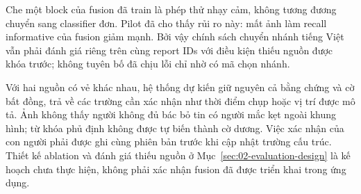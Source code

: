 Che một block của fusion đã train là phép thử nhạy cảm, không tương đương chuyển sang classifier đơn. Pilot đã cho thấy rủi ro này: mất ảnh làm recall informative của fusion giảm mạnh. Bởi vậy chính sách chuyển nhánh tiếng Việt vẫn phải đánh giá riêng trên cùng report IDs với điều kiện thiếu nguồn được khóa trước; không tuyên bố đã chịu lỗi chỉ nhờ có mã chọn nhánh.

Với hai nguồn có vẻ khác nhau, hệ thống dự kiến giữ nguyên cả bằng chứng và cờ bất đồng, trả về các trường cần xác nhận như thời điểm chụp hoặc vị trí được mô tả. Ảnh không thấy người không đủ bác bỏ tin có người mắc kẹt ngoài khung hình; từ khóa phủ định không được tự biến thành cờ dương. Việc xác nhận của con người phải được ghi cùng phiên bản trước khi cập nhật trường cấu trúc. Thiết kế ablation và đánh giá thiếu nguồn ở Mục~\ref{sec:02-evaluation-design} là kế hoạch chưa thực hiện, không phải xác nhận fusion đã được triển khai trong ứng dụng.
